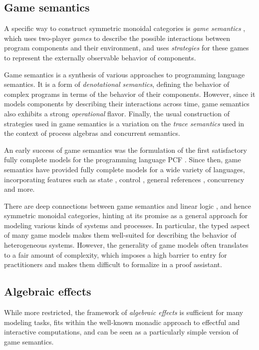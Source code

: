 \documentclass[11pt,oneside,draft]{book}
\theoremstyle{definition}
\begin{document}

\subsection{Game semantics} %

A specific way to construct symmetric monoidal categories
is \emph{game semantics} \citep{cspgs},
which uses two-player \emph{games} to describe
the possible interactions between
program components and their environment,
and uses \emph{strategies} for these games
to represent the externally observable behavior
of components.

Game semantics is a synthesis
of various approaches to programming language semantics.
It is a form of \emph{denotational semantics},
defining the behavior of complex programs
in terms of the behavior of their components.
However,
since it models components
by describing their interactions across time,
game semantics also exhibits a strong \emph{operational} flavor.
Finally,
the usual construction of strategies used in game semantics
is a variation on the \emph{trace semantics}
used in the context of process algebras
and concurrent semantics.

An early success of game semantics
was the formulation of the first satisfactory
fully complete models for
the programming language PCF \citep{pcfajm,pcfho}.
Since then,
game semantics have provided fully complete models
for a wide variety of languages,
incorporating features such as
state \citep{gsia},
control \citep{gscontrol},
general references \citep{gsgr},
concurrency \citep{gsconcur}
and more.

There are deep connections between
game semantics and linear logic \citep{gsnecessary},
and hence symmetric monoidal categories,
hinting at its promise
as a general approach for modeling
various kinds of systems and processes.
In particular,
the typed aspect of many game models
makes them well-suited for
describing the behavior of heterogeneous systems.
However,
the generality of game models
often translates to a fair amount of complexity,
which imposes a high barrier to entry for practitioners
and makes them difficult to formalize in a proof assistant.


\subsection{Algebraic effects} %

While more restricted,
the framework of \emph{algebraic effects} \citep{effadq}
is sufficient for many modeling tasks,
fits within the well-known monadic approach
to effectful and interactive computations,
and can be seen as a particularly simple version
of game semantics.
\end{document}
